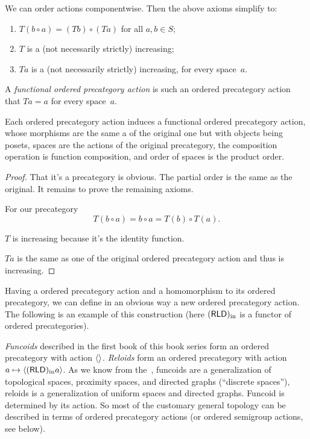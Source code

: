 We can order actions componentwise. Then the above axioms simplify to:
\begin{enumerate}
\item $T(b\circ a) = (Tb)\circ(Ta)$ for all $a,b\in S$;
\item $T$ is a (not necessarily strictly) increasing;
\item $Ta$ is a (not necessarily strictly) increasing, for every space~$a$.
\end{enumerate}

\begin{defn}
A \emph{functional ordered precategory action} is such an ordered precategory action that $Ta=a$ for every space~$a$.
\end{defn}

\begin{thm}
Each ordered precategory action induces a functional ordered precategory action, whose morphisms are the same a of the original one but with objects being posets, spaces are the actions of the original precategory, the composition operation is function composition, and order of spaces is the product order.
\end{thm}

\begin{proof}
That it's a precategory is obvious. The partial order is the same as the original. It remains to prove the remaining axioms.

For our precategory
\[ T(b\circ a) = b\circ a=T(b)\circ T(a). \]

$T$ is increasing because it's the identity function.

$Ta$ is the same as one of the original ordered precategory action and thus is increasing.
\end{proof}

Having a ordered precategory action and a homomorphism to its ordered precategory, we can define in an obvious way a new ordered precategory action. The following is an example of this construction (here $(\mathsf{RLD})_{\mathrm{in}}$ is a functor of ordered precategories).

\emph{Funcoids} described in the first book of this book series form an ordered precategory with action $\left\langle \right\rangle$. \emph{Reloids} form an ordered precategory with action $a\mapsto\left\langle (\mathsf{RLD})_{\mathrm{in}} a\right\rangle$.
As we know from the~\cite{volume-1}, funcoids are a generalization of topological spaces, proximity spaces, and directed graphs (``discrete spaces''), reloids is a generalization of uniform spaces and directed graphs. Funcoid is determined by its action. So most of the customary general topology can be described in terms of ordered precategory actions (or ordered semigroup actions, see below).

